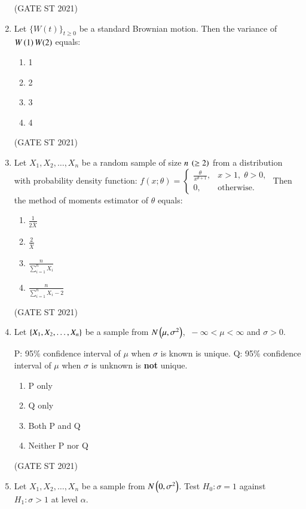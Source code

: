 \documentclass[journal,12pt,onecolumn]{IEEEtran}
\theoremstyle{remark}
\begin{document}
\begin{enumerate}
\hfill (GATE ST 2021) \\


\item
Let $\{W(t)\}_{t \geq 0}$ be a standard Brownian motion.  
Then the variance of $W\left(1\right) W(2)$ equals:
\begin{enumerate}
\item 1
\item 2
\item 3
\item 4
\end{enumerate}

\hfill (GATE ST 2021) \\

\item
Let $X_1, X_2, \dots, X_n$ be a random sample of size $n \ \left(\geq 2\right)$ from a distribution with probability density function:
$
f(x; \theta) =
\begin{cases}
\frac{\theta}{x^{\theta+1}}, & x > 1, \; \theta > 0, \\
0, & \text{otherwise}.
\end{cases}
$
Then the method of moments estimator of $\theta$ equals:
\begin{enumerate}
\item $\frac{1}{2\bar{X}}$
\item $\frac{2}{\bar{X}}$
\item $\frac{n}{\sum_{i=1}^n X_i}$
\item $\frac{n}{\sum_{i=1}^n X_i - 2}$
\end{enumerate}

\hfill (GATE ST 2021) \\

\item
Let $\left\{ X_1, X_2, \dots, X_n \right\}$ be a sample from $N\left(\mu,\sigma^2\right)$, $\ -\infty < \mu < \infty$ and $\sigma > 0$.

P: 95\% confidence interval of $\mu$ when $\sigma$ is known is unique.  
Q: 95\% confidence interval of $\mu$ when $\sigma$ is unknown is \textbf{not} unique.

\begin{enumerate}
\item P only
\item Q only
\item Both P and Q
\item Neither P nor Q
\end{enumerate}
\hfill (GATE ST 2021) \\


\item
Let $X_1, X_2, \dots, X_n$ be a sample from $N\left(0,\sigma^2\right)$.  
Test $H_0: \sigma = 1$ against $H_1: \sigma > 1$ at level $\alpha$.


\end{enumerate}
\end{document}
